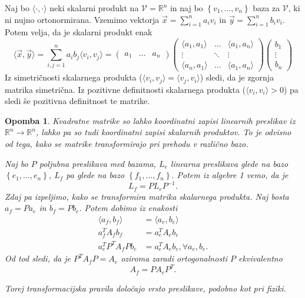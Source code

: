 \documentclass[10pt, a4paper]{article}
\newtheorem*{opomba}{Opomba}
\begin{document}
Naj bo $\langle \cdot , \cdot  \rangle $  neki skalarni
produkt na $\mathcal{V} = \mathbb{R}^n$ in naj bo $\left\{
v_1, \ldots , v_{n} \right\}$  baza za $\mathcal{V}$, ki ni
nujno ortonormirana. Vzemimo vektorja $\vec{x}  =
\sum_{i=1}^{n} a_{i}v_{i}$ in $\vec{y}  = \sum_{i=1}^{n}
b_{i}v_{i}.$ Potem velja, da je skalarni produkt enak \[
\langle \vec{x} , \vec{y} \rangle = \sum_{i,j = 1}^{n}
a_{i}b_{j}\langle v_{i}, v_{j} \rangle = \begin{pmatrix}
a_1 & \ldots & a_n \end{pmatrix} \begin{pmatrix}
\langle a_1, a_1 \rangle & \dots & \langle a_1, a_n
\rangle \\ \vdots & \ddots & \vdots \\ \langle a_n,
a_1 \rangle & \dots & \langle a_1,a_n \rangle
\end{pmatrix} \begin{pmatrix} b_1 \\ \vdots \\ b_n
\end{pmatrix} \] Iz simetričnosti skalarnega produkta
($\langle v_{i}, v_{j} \rangle  = \langle v_{j},  v_{i}
\rangle $) sledi, da je zgornja matrika simetrična. Iz
pozitivne definitnosti skalarnega produkta ($\langle
v_{i}, v_{i} \rangle > 0$) pa sledi še pozitivna
definitnost te matrike. 

\begin{opomba}
Kvadratne matrike so lahko koordinatni
zapisi linearnih preslikav iz $\mathbb{R}^n \to
\mathbb{R}^n$, lahko pa so tudi koordinatni zapisi
skalarnih produktov. To je odvisno od tega, kako se
matrike transformirajo pri prehodu v različno bazo.

Naj bo $P$ poljubna preslikava med bazama, $L_e$
linearna preslikava glede na bazo $\left\{ e_1, \ldots
, e_{n}\right\}$, $L_f$ pa glede na bazo $\left\{ f_1,
\ldots, f_{n}\right\}.$ Potem iz algebre 1 vemo, da je \[
L_f = PL_eP^{-1}. \]Zdaj pa izpeljimo, kako se
transformira matrika skalarnega produkta. Naj bosta
$a_f = Pa_e$ in $b_f = Pb_e$. Potem dobimo iz enakosti
\begin{align*} \langle a_f, b_f \rangle &= \langle
a_e, b_e \rangle \\ a_f^{T} A_f b_f &= a_e^{T} A_e
b_e \\ a_e^{T} P^{T} A_f P b_e &= a_e^{T} A_e b_e,
\forall a_e, b_e. \end{align*} Od tod sledi, da je
$P^{T}A_fP = A_e$ oziroma zaradi ortogonalnosti
$P$ ekvivalentno \[A_f = PA_eP^{T}.\]

Torej transformacijska pravila določajo vrsto
preslikave, podobno kot pri fiziki. \end{opomba}
\end{document}
